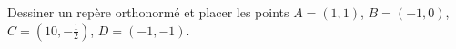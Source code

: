 
\begin{exercice}\label{exoSeconde-0001}

    Dessiner un repère orthonormé et placer les points \( A=(1,1)\), \( B=(-1,0)\), \( C=(10,-\frac{ 1 }{2})\), \( D=(-1,-1)\).

\end{exercice}

